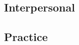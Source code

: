 \documentclass[conference]{IEEEtran}
\begin{document}
\subsection{Interpersonal}

\subsection{Practice}

\end{document}
